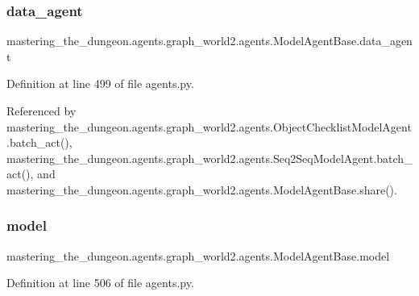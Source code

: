 \subsubsection{\texorpdfstring{data\+\_\+agent}{data\_agent}}
{\footnotesize\ttfamily mastering\+\_\+the\+\_\+dungeon.\+agents.\+graph\+\_\+world2.\+agents.\+Model\+Agent\+Base.\+data\+\_\+agent}



Definition at line 499 of file agents.\+py.



Referenced by mastering\+\_\+the\+\_\+dungeon.\+agents.\+graph\+\_\+world2.\+agents.\+Object\+Checklist\+Model\+Agent.\+batch\+\_\+act(), mastering\+\_\+the\+\_\+dungeon.\+agents.\+graph\+\_\+world2.\+agents.\+Seq2\+Seq\+Model\+Agent.\+batch\+\_\+act(), and mastering\+\_\+the\+\_\+dungeon.\+agents.\+graph\+\_\+world2.\+agents.\+Model\+Agent\+Base.\+share().

\mbox{\label{classmastering__the__dungeon_1_1agents_1_1graph__world2_1_1agents_1_1ModelAgentBase_a702a30a15a5e6feb5d78751d6708766c}} 
\subsubsection{\texorpdfstring{model}{model}}
{\footnotesize\ttfamily mastering\+\_\+the\+\_\+dungeon.\+agents.\+graph\+\_\+world2.\+agents.\+Model\+Agent\+Base.\+model}



Definition at line 506 of file agents.\+py.



